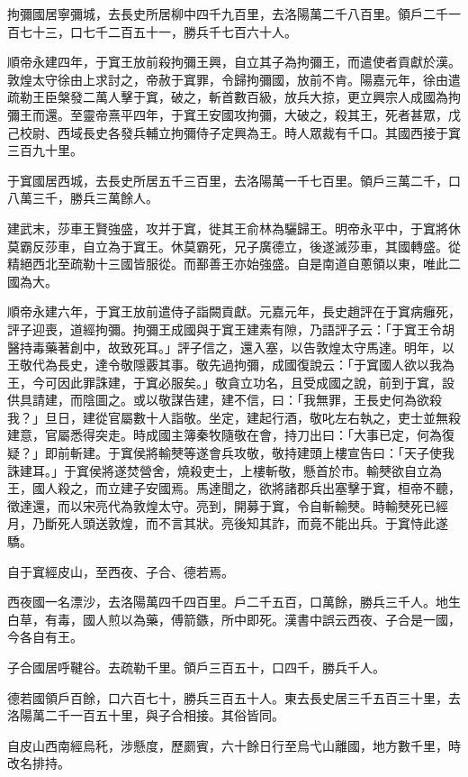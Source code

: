 \begin{pinyinscope}
拘彌國居寧彌城，去長史所居柳中四千九百里，去洛陽萬二千八百里。領戶二千一百七十三，口七千二百五十一，勝兵千七百六十人。

順帝永建四年，于窴王放前殺拘彌王興，自立其子為拘彌王，而遣使者貢獻於漢。敦煌太守徐由上求討之，帝赦于窴罪，令歸拘彌國，放前不肯。陽嘉元年，徐由遣疏勒王臣槃發二萬人擊于窴，破之，斬首數百級，放兵大掠，更立興宗人成國為拘彌王而還。至靈帝熹平四年，于窴王安國攻拘彌，大破之，殺其王，死者甚眾，戊己校尉、西域長史各發兵輔立拘彌侍子定興為王。時人眾裁有千口。其國西接于窴三百九十里。

于窴國居西城，去長史所居五千三百里，去洛陽萬一千七百里。領戶三萬二千，口八萬三千，勝兵三萬餘人。

建武末，莎車王賢強盛，攻并于窴，徙其王俞林為驪歸王。明帝永平中，于窴將休莫霸反莎車，自立為于窴王。休莫霸死，兄子廣德立，後遂滅莎車，其國轉盛。從精絕西北至疏勒十三國皆服從。而鄯善王亦始強盛。自是南道自蔥領以東，唯此二國為大。

順帝永建六年，于窴王放前遣侍子詣闕貢獻。元嘉元年，長史趙評在于窴病癰死，評子迎喪，道經拘彌。拘彌王成國與于窴王建素有隙，乃語評子云：「于窴王令胡醫持毒藥著創中，故致死耳。」評子信之，還入塞，以告敦煌太守馬達。明年，以王敬代為長史，達令敬隱覈其事。敬先過拘彌，成國復說云：「于窴國人欲以我為王，今可因此罪誅建，于窴必服矣。」敬貪立功名，且受成國之說，前到于窴，設供具請建，而陰圖之。或以敬謀告建，建不信，曰：「我無罪，王長史何為欲殺我？」旦日，建從官屬數十人詣敬。坐定，建起行酒，敬叱左右執之，吏士並無殺建意，官屬悉得突走。時成國主簿秦牧隨敬在會，持刀出曰：「大事已定，何為復疑？」即前斬建。于窴侯將輸僰等遂會兵攻敬，敬持建頭上樓宣告曰：「天子使我誅建耳。」于窴侯將遂焚營舍，燒殺吏士，上樓斬敬，懸首於巿。輸僰欲自立為王，國人殺之，而立建子安國焉。馬達聞之，欲將諸郡兵出塞擊于窴，桓帝不聽，徵達還，而以宋亮代為敦煌太守。亮到，開募于窴，令自斬輸僰。時輸僰死已經月，乃斷死人頭送敦煌，而不言其狀。亮後知其詐，而竟不能出兵。于窴恃此遂驕。

自于窴經皮山，至西夜、子合、德若焉。

西夜國一名漂沙，去洛陽萬四千四百里。戶二千五百，口萬餘，勝兵三千人。地生白草，有毒，國人煎以為藥，傅箭鏃，所中即死。漢書中誤云西夜、子合是一國，今各自有王。

子合國居呼鞬谷。去疏勒千里。領戶三百五十，口四千，勝兵千人。

德若國領戶百餘，口六百七十，勝兵三百五十人。東去長史居三千五百三十里，去洛陽萬二千一百五十里，與子合相接。其俗皆同。

自皮山西南經烏秅，涉懸度，歷罽賓，六十餘日行至烏弋山離國，地方數千里，時改名排持。


\end{pinyinscope}
